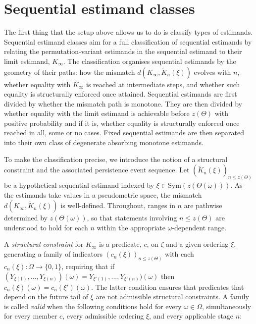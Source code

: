 \documentclass{article}
\newcommand{\1}{\mathbbm{1}}
\begin{document}
\section{Sequential estimand classes}
\label{sec:classes}

The first thing that the setup above allows us to do is classify types of estimands. Sequential estimand classes aim for a full classification of sequential estimands by relating the permutation-variant estimands in the sequential estimand to their limit estimand, $K_\infty$. The classification organises sequential estimands by the geometry of their paths: how the mismatch $d(K_\infty, \widetilde K_n(\xi))$ evolves with $n$, whether equality with $K_\infty$ is reached at intermediate steps, and whether such equality is structurally enforced once attained. Sequential estimands are first divided by whether the mismatch path is monotone. They are then divided by whether equality with the limit estimand is achievable before $z(\Theta)$ with positive probability and if it is, whether equality is structurally enforced once reached in all, some or no cases. Fixed sequential estimands are then separated into their own class of degenerate absorbing monotone estimands.

To make the classification precise, we introduce the notion of a structural constraint and the associated persistence event sequence. Let $(\widetilde K_n(\xi))_{n \le z(\Theta)}$ be a hypothetical sequential estimand indexed by $\xi \in \mathrm{Sym}(z(\Theta(\omega)))$. As the estimands take values in a pseudometric space, the mismatch $d(K_\infty, \widetilde K_n(\xi))$ is well-defined. Throughout, ranges in $n$ are pathwise determined by $z(\Theta(\omega))$, so that statements involving $n \le z(\Theta)$ are understood to hold for each $n$ within the appropriate $\omega$-dependent range.

A \textit{structural constraint} for $K_\infty$ is a predicate, $c$, on $\zeta$ and a given ordering $\xi$, generating a family of indicators $(c_n(\xi))_{n \le z(\Theta)}$ with each $c_n(\xi): \Omega \to \{0, 1\}$, requiring that if $(Y_{\xi(1)},...,Y_{\xi(n)})(\omega)=Y_{\xi'(1)},...,Y_{\xi'(n)})(\omega)$ then $c_n(\xi)(\omega)=c_n(\xi')(\omega)$. The latter condition ensures that predicates that depend on the future tail of $\xi$ are not admissible structural constraints. A family is called \textit{valid} when the following conditions hold for every $\omega \in \Omega$, simultaneously for every member $c$, every admissible ordering $\xi$, and every applicable stage $n$:
\end{document}
